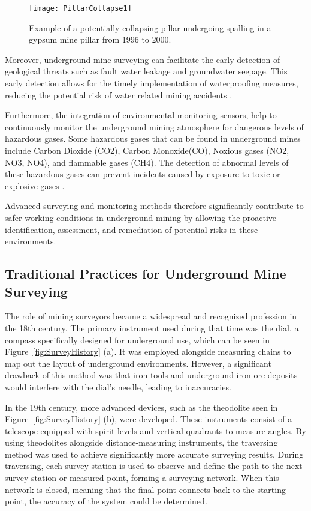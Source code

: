 \begin{figure}[!h]
    \centering
    \texttt{[image: PillarCollapse1]}
    \caption[Example of a modern total station]{
    Example of a potentially collapsing pillar undergoing spalling in a gypsum mine pillar from 1996 to 2000\cite{Sorgi2011}.
    }
    \label{fig:PillarCollapse1}
\end{figure}



Moreover, underground mine surveying can facilitate the early detection of geological threats such as fault water leakage and groundwater seepage. This early detection allows for the timely implementation of waterproofing measures, reducing the potential risk of water related mining accidents \cite{Liu2019}. 

Furthermore, the integration of environmental monitoring sensors, help to continuously monitor the underground mining atmosphere for dangerous levels of hazardous gases. Some hazardous gases that can be found in underground mines include Carbon Dioxide (CO2), Carbon Monoxide(CO), Noxious gases (NO2, NO3, NO4), and flammable gases (CH4). The detection of abnormal levels of these hazardous gases can prevent incidents caused by exposure to toxic or explosive gases \cite{Anas2017}. 

Advanced surveying and monitoring methods therefore significantly contribute to safer working conditions in underground mining by allowing the proactive identification, assessment, and remediation of potential risks in these environments.

\subsection{Traditional Practices for Underground Mine Surveying}
The role of mining surveyors became a widespread and recognized profession in the 18th century. The primary instrument used during that time was the dial, a compass specifically designed for underground use, which can be seen in Figure~\ref{fig:SurveyHistory} (a). It was employed alongside measuring chains to map out the layout of underground environments. However, a significant drawback of this method was that iron tools and underground iron ore deposits would interfere with the dial's needle, leading to inaccuracies\cite{vanWegen2018}. 

In the 19th century, more advanced devices, such as the theodolite seen in Figure~\ref{fig:SurveyHistory} (b), were developed. These instruments consist of a telescope equipped with spirit levels and vertical quadrants to measure angles. By using theodolites alongside distance-measuring instruments, the traversing method was used to achieve significantly more accurate surveying results. During traversing, each survey station is used to observe and define the path to the next survey station or measured point, forming a surveying network. When this network is closed, meaning that the final point connects back to the starting point, the accuracy of the system could be determined\cite{vanWegen2018, Deakin2012}. 

